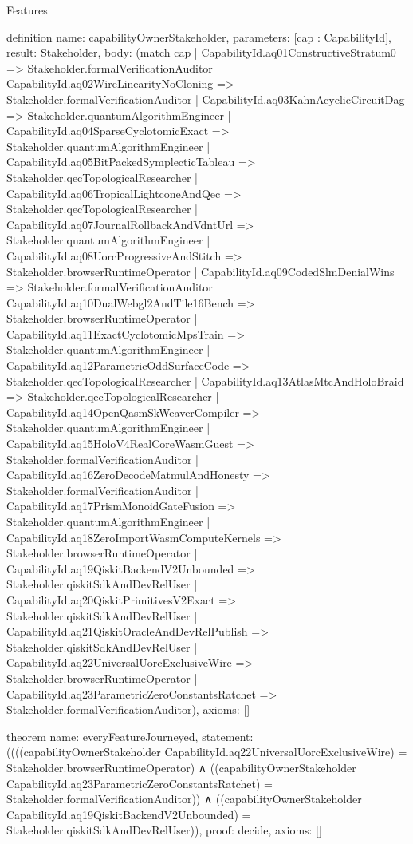 \begin{lexlean}{Features}
\begin{semanticmodule}
definition{
  name: capabilityOwnerStakeholder,
  parameters: [cap : CapabilityId],
  result: Stakeholder,
  body: (match cap
    | CapabilityId.aq01ConstructiveStratum0 => Stakeholder.formalVerificationAuditor
    | CapabilityId.aq02WireLinearityNoCloning => Stakeholder.formalVerificationAuditor
    | CapabilityId.aq03KahnAcyclicCircuitDag => Stakeholder.quantumAlgorithmEngineer
    | CapabilityId.aq04SparseCyclotomicExact => Stakeholder.quantumAlgorithmEngineer
    | CapabilityId.aq05BitPackedSymplecticTableau => Stakeholder.qecTopologicalResearcher
    | CapabilityId.aq06TropicalLightconeAndQec => Stakeholder.qecTopologicalResearcher
    | CapabilityId.aq07JournalRollbackAndVdntUrl => Stakeholder.quantumAlgorithmEngineer
    | CapabilityId.aq08UorcProgressiveAndStitch => Stakeholder.browserRuntimeOperator
    | CapabilityId.aq09CodedSlmDenialWins => Stakeholder.formalVerificationAuditor
    | CapabilityId.aq10DualWebgl2AndTile16Bench => Stakeholder.browserRuntimeOperator
    | CapabilityId.aq11ExactCyclotomicMpsTrain => Stakeholder.quantumAlgorithmEngineer
    | CapabilityId.aq12ParametricOddSurfaceCode => Stakeholder.qecTopologicalResearcher
    | CapabilityId.aq13AtlasMtcAndHoloBraid => Stakeholder.qecTopologicalResearcher
    | CapabilityId.aq14OpenQasmSkWeaverCompiler => Stakeholder.quantumAlgorithmEngineer
    | CapabilityId.aq15HoloV4RealCoreWasmGuest => Stakeholder.formalVerificationAuditor
    | CapabilityId.aq16ZeroDecodeMatmulAndHonesty => Stakeholder.formalVerificationAuditor
    | CapabilityId.aq17PrismMonoidGateFusion => Stakeholder.quantumAlgorithmEngineer
    | CapabilityId.aq18ZeroImportWasmComputeKernels => Stakeholder.browserRuntimeOperator
    | CapabilityId.aq19QiskitBackendV2Unbounded => Stakeholder.qiskitSdkAndDevRelUser
    | CapabilityId.aq20QiskitPrimitivesV2Exact => Stakeholder.qiskitSdkAndDevRelUser
    | CapabilityId.aq21QiskitOracleAndDevRelPublish => Stakeholder.qiskitSdkAndDevRelUser
    | CapabilityId.aq22UniversalUorcExclusiveWire => Stakeholder.browserRuntimeOperator
    | CapabilityId.aq23ParametricZeroConstantsRatchet => Stakeholder.formalVerificationAuditor),
  axioms: []
}

theorem{
  name: everyFeatureJourneyed,
  statement: ((((capabilityOwnerStakeholder CapabilityId.aq22UniversalUorcExclusiveWire)
      = Stakeholder.browserRuntimeOperator)
    ∧ ((capabilityOwnerStakeholder CapabilityId.aq23ParametricZeroConstantsRatchet)
      = Stakeholder.formalVerificationAuditor))
    ∧ ((capabilityOwnerStakeholder CapabilityId.aq19QiskitBackendV2Unbounded)
      = Stakeholder.qiskitSdkAndDevRelUser)),
  proof: decide{},
  axioms: []
}

\end{semanticmodule}
\end{lexlean}
